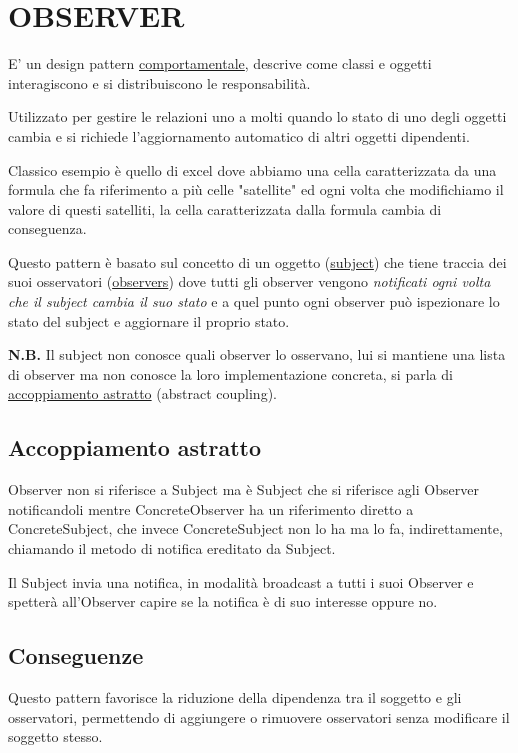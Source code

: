 
\chapter{OBSERVER}

E' un design pattern \underline{comportamentale}, descrive come classi e oggetti interagiscono e si distribuiscono le responsabilità. 

Utilizzato per gestire le relazioni uno a molti quando lo stato di uno degli oggetti cambia e si richiede l'aggiornamento automatico di altri oggetti dipendenti.
\smallskip

Classico esempio è quello di excel dove abbiamo una cella caratterizzata da una formula che fa riferimento a più celle "satellite" ed ogni volta che modifichiamo il
valore di questi satelliti, la cella caratterizzata dalla formula cambia di conseguenza.
\smallskip

Questo pattern è basato sul concetto di un oggetto (\underline{subject}) che tiene traccia dei suoi osservatori (\underline{observers}) dove tutti gli observer vengono 
\textit{notificati ogni volta che il subject cambia il suo stato} e a quel punto ogni observer può ispezionare lo stato del subject e aggiornare il proprio stato.

\medskip
\textbf{N.B.} Il subject non conosce quali observer lo osservano, lui si mantiene una lista di observer ma non conosce la loro implementazione concreta, si parla di
\underline{accoppiamento astratto} (abstract coupling).

\section{Accoppiamento astratto}
Observer non si riferisce a Subject ma è Subject che si riferisce agli Observer notificandoli mentre ConcreteObserver ha un riferimento diretto a ConcreteSubject, 
che invece ConcreteSubject non lo ha ma lo fa, indirettamente, chiamando il metodo di notifica ereditato da Subject.

Il Subject invia una notifica, in modalità broadcast a tutti i suoi Observer e spetterà all'Observer capire se la notifica è di suo interesse oppure no.

\section{Conseguenze}
Questo pattern favorisce la riduzione della dipendenza tra il soggetto e gli osservatori, permettendo di aggiungere o rimuovere osservatori senza modificare il 
soggetto stesso. 


